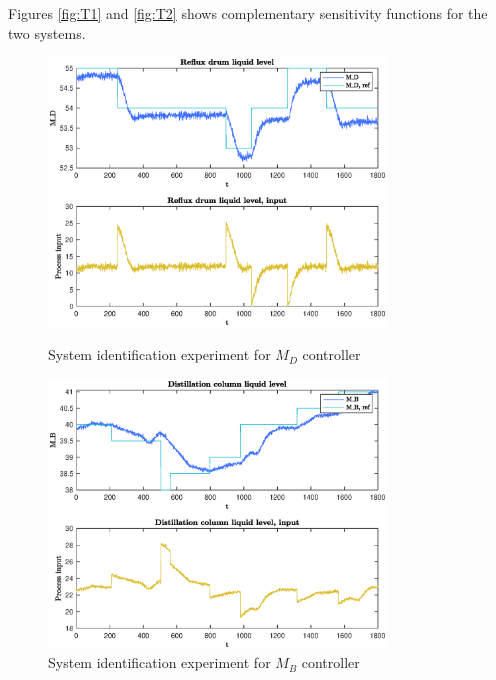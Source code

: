 \documentclass[12pt]{article}
\begin{document}
Figures \ref{fig:T1} and \ref{fig:T2} shows complementary sensitivity functions for the two systems. 

\begin{figure}
\centering
\includegraphics[width=0.8\textwidth]{../Systemanalyse/Log_Data_to_Matlab/Figurer/Identifisering/MD_eksperiment.eps}
\caption{System identification experiment for $M_D$ controller}
\label{fig:MD_experiment}

\includegraphics[width=0.8\textwidth]{../Systemanalyse/Log_Data_to_Matlab/Figurer/Identifisering/MB_eksperiment.eps}
\caption{System identification experiment for $M_B$ controller}
\label{fig:MD_experiment}
\end{figure}
\end{document}
